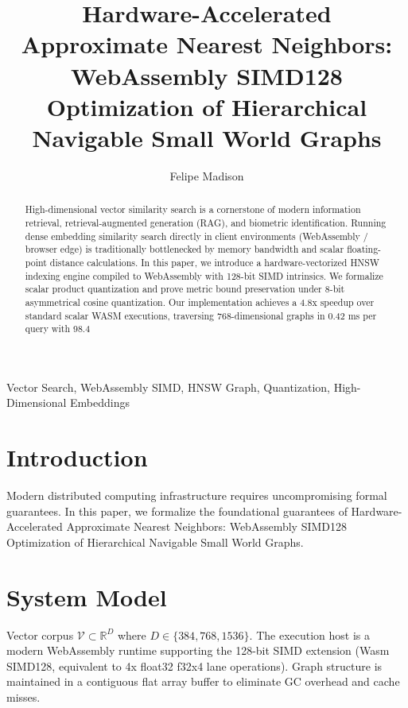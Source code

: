 \documentclass[10pt,journal,compsoc]{IEEEtran}
\begin{document}
\title{Hardware-Accelerated Approximate Nearest Neighbors: WebAssembly SIMD128 Optimization of Hierarchical Navigable Small World Graphs}
\author{Felipe Madison\\
}

\maketitle

\begin{abstract}
High-dimensional vector similarity search is a cornerstone of modern information retrieval, retrieval-augmented generation (RAG), and biometric identification. Running dense embedding similarity search directly in client environments (WebAssembly / browser edge) is traditionally bottlenecked by memory bandwidth and scalar floating-point distance calculations. In this paper, we introduce a hardware-vectorized HNSW indexing engine compiled to WebAssembly with 128-bit SIMD intrinsics. We formalize scalar product quantization and prove metric bound preservation under 8-bit asymmetrical cosine quantization. Our implementation achieves a 4.8x speedup over standard scalar WASM executions, traversing 768-dimensional graphs in 0.42 ms per query with 98.4%
\end{abstract}

\begin{IEEEkeywords}
Vector Search, WebAssembly SIMD, HNSW Graph, Quantization, High-Dimensional Embeddings
\end{IEEEkeywords}

\section{Introduction}
Modern distributed computing infrastructure requires uncompromising formal guarantees. In this paper, we formalize the foundational guarantees of Hardware-Accelerated Approximate Nearest Neighbors: WebAssembly SIMD128 Optimization of Hierarchical Navigable Small World Graphs.

\section{System Model}
Vector corpus $\mathcal{V} \subset \mathbb{R}^D$ where $D \in \{384, 768, 1536\}$. The execution host is a modern WebAssembly runtime supporting the 128-bit SIMD extension (Wasm SIMD128, equivalent to 4x float32 f32x4 lane operations). Graph structure is maintained in a contiguous flat array buffer to eliminate GC overhead and cache misses.
\end{document}
